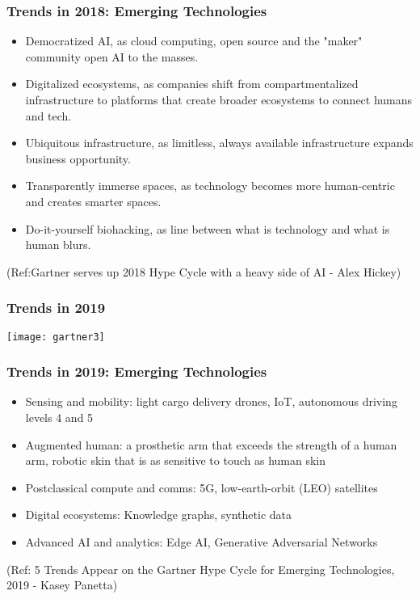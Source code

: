 \begin{frame}[fragile]\frametitle{Trends in 2018: Emerging Technologies}
\begin{itemize}
\item Democratized AI, as cloud computing, open source and the "maker" community open AI to the masses.

\item Digitalized ecosystems, as companies shift from compartmentalized infrastructure to platforms that create broader ecosystems to connect humans and tech.

\item Ubiquitous infrastructure, as limitless, always available infrastructure expands business opportunity.

\item Transparently immerse spaces, as technology becomes more human-centric and creates smarter spaces.

\item Do-it-yourself biohacking, as line between what is technology and what is human blurs.

\end{itemize}


{\tiny (Ref:Gartner serves up 2018 Hype Cycle with a heavy side of AI - Alex Hickey)}

\end{frame}

\begin{frame}[fragile]\frametitle{Trends in 2019}

\begin{center}
\texttt{[image: gartner3]}
\end{center}

\end{frame}

\begin{frame}[fragile]\frametitle{Trends in 2019: Emerging Technologies}
\begin{itemize}
\item Sensing and mobility: light cargo delivery drones, IoT, autonomous driving levels 4 and 5
\item Augmented human: a prosthetic arm that exceeds the strength of a human arm, robotic skin that is as sensitive to touch as human skin
\item Postclassical compute and comms: 5G,  low-earth-orbit (LEO) satellites 
\item Digital ecosystems: Knowledge graphs, synthetic data
\item Advanced AI and analytics: Edge AI, Generative Adversarial Networks

\end{itemize}


{\tiny (Ref: 5 Trends Appear on the Gartner Hype Cycle for Emerging Technologies, 2019 - Kasey Panetta)}

\end{frame}


